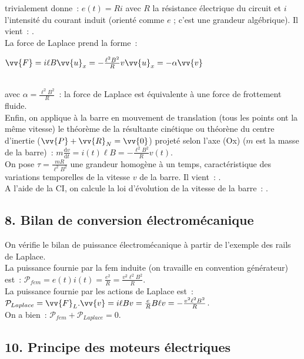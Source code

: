 \documentclass{article}
\newcommand{\mathcolorbox}[2]{\colorbox{#1}{$#2$}}
\renewcommand\overrightarrow{\vv}
\begin{document}
\begin{itemize}
trivialement donne : $e(t) = Ri$ avec $R$ la résistance électrique
du circuit et $i$ l'intensité du courant induit (orienté comme $e$ ;
c'est une grandeur algébrique).
Il vient : . \\
La force de Laplace prend la forme : \\
\centerline{\mathcolorbox{gray!20}{\overrightarrow{F} =i\ell B\overrightarrow{u}_{x} =
-\frac{\ell^{2}B^{2}}{R}v\overrightarrow{u}_{x} = -\alpha
\overrightarrow{v}}} \\
avec $\alpha = \frac{\ell^{2}B^{2}}{R}$ : la
force de Laplace est équivalente à une force de frottement fluide.
\\
Enfin, on applique à la barre en mouvement de translation (tous les
points ont la même vitesse) le théorème de la résultante cinétique
ou théorène du centre d'inertie
($\overrightarrow{P}+\overrightarrow{R}_{N} = \overrightarrow{0}$)
projeté selon l'axe (Ox) ($m$ est la masse de la barre) :
$m\frac{\mathrm{d}v}{\mathrm{d}t} = i(t)\ell B = -\frac{\ell^{2}B^{2}}{R}v(t)$. \\
On pose $\tau = \frac{mR}{\ell^{2}B^{2}}$ une grandeur homogène à un
temps, caractéristique des variations temporelles de la vitesse $v$
de la barre. Il vient : .
\\
A l'aide de la CI, on calcule la loi d'évolution de la vitesse de la
barre : .
\end{itemize}

\subsection*{8. Bilan de conversion électromécanique}
On vérifie le bilan de puissance électromécanique à partir de
l'exemple des rails de Laplace. \\
La puissance fournie par la fem induite (on travaille en convention
générateur) est : $\mathcal{P}_{fem} =
e(t)i(t) = \frac{e^{2}}{R} = \frac{v^{2}\ell^{2}B^{2}}{R}$. \\
La puissance fournie par les actions de Laplace est :
$\mathcal{P}_{Laplace} = \overrightarrow{F}_{L}.\overrightarrow{v} =
i\ell B v = \frac{e}{R}B\ell v = -\frac{v^{2}\ell^{2} B^{2}}{R}$. \\
On a bien : $\mathcal{P}_{fem}+\mathcal{P}_{Laplace} = 0$.

\subsection*{10. Principe des moteurs électriques}
\end{document}

